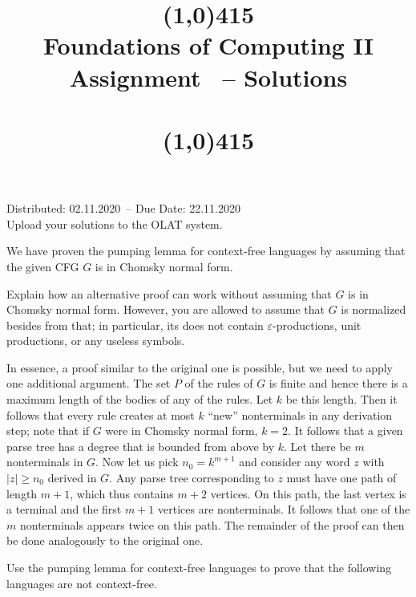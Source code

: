 \documentclass{exercise}
\title{\line(1,0){415}\\
  Foundations of Computing II\\
  \Large Assignment \theexercise\ -- Solutions\\[1em]
  \large{\topics}\\
  \line(1,0){415}}
\newcommand{\distdate}{02.11.2020}
\newcommand{\duedate}{22.11.2020}
\begin{document}
\maketitle

\begin{center}
  Distributed: \distdate\ -- Due Date: \duedate\\[1em]
  Upload your solutions to the OLAT system.\\[3em]
\end{center}


We have proven the pumping lemma for context-free languages by assuming that the
given CFG $G$ is in Chomsky normal form.

Explain how an alternative proof can work without assuming that $G$ is in
Chomsky normal form.  However, you are allowed to assume that $G$ is normalized
besides from that; in particular, its does not contain $\varepsilon$-productions,
unit productions, or any useless symbols.

\begin{solution}
  In essence, a proof similar to the original one is possible, but we need to
  apply one additional argument.  The set $P$ of the rules of $G$ is finite and
  hence there is a maximum length of the bodies of any of the rules.  Let $k$
  be this length.  Then it follows that every rule creates at most $k$ ``new''
  nonterminals in any derivation step; note that if $G$ were in Chomsky normal
  form, $k=2$.  It follows that a given parse tree has a degree that is bounded
  from above by $k$.  Let there be $m$ nonterminals in $G$.
  Now let us pick $n_0=k^{m+1}$ and consider any word $z$ with $|z|\ge n_0$
  derived in $G$.  Any parse tree corresponding to $z$ must have one path of length
  $m+1$, which thus contains $m+2$ vertices.  On this path, the last vertex is a
  terminal and the first $m+1$ vertices are nonterminals.  It follows that one
  of the $m$ nonterminals appears twice on this path.  The remainder of the proof
  can then be done analogously to the original one.
\end{solution}


Use the pumping lemma for context-free languages to prove that the following languages
are not context-free.
\end{document}
